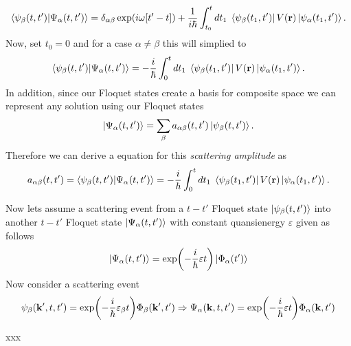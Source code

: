 \begin{equation} \label{4.15}
  \begin{aligned}
    \braket{\psi_{\beta}(t,t')}{\Psi_{\alpha}(t,t')} =
    \delta_{\alpha\beta}\exp(i\omega\qty[t'-t]) +
    \frac{1}{i\hbar}
    \int_{t_0}^t dt_1 \;
    \bra{\psi_{\beta}(t_1,t')}
    V(\mathbf{r}) \ket{\psi_{\alpha}(t_1,t')}.
  \end{aligned}
\end{equation}
Now, set $t_0 = 0$ and for a case $\alpha \neq \beta$ this will simplied to
\begin{equation} \label{4.16}
  \begin{aligned}
    \braket{\psi_{\beta}(t,t')}{\Psi_{\alpha}(t,t')} =
    -
    \frac{i}{\hbar}
    \int_{0}^t dt_1 \;
    \bra{\psi_{\beta}(t_1,t')}
    V(\mathbf{r}) \ket{\psi_{\alpha}(t_1,t')}.
  \end{aligned}
\end{equation}
In addition, since our Floquet states create a basis for composite space we can represent any solution using our Floquet states
\begin{equation} \label{4.17}
  \ket{\Psi_{\alpha}(t,t')} = \sum_{\beta} a_{\alpha\beta}(t,t')
  \ket{\psi_{\beta}(t,t')}.
\end{equation}
Therefore we can derive a equation for this \textit{scattering amplitude} as
\begin{equation} \label{4.18}
  a_{\alpha\beta}(t,t') =
  \braket{\psi_{\beta}(t,t')}{\Psi_{\alpha}(t,t')} =
  -
  \frac{i}{\hbar}
  \int_{0}^t dt_1 \;
  \bra{\psi_{\beta}(t_1,t')}
  V(\mathbf{r}) \ket{\psi_{\alpha}(t_1,t')}.
\end{equation}

\vspace{5mm}
\noindent
Now lets assume a scattering event from a $t-t'$ Floquet state $\ket{\psi_{\beta}(t,t')}$ into another $t-t'$ Floquet state $\ket{\Psi_{\alpha}(t,t')}$ with constant quansienergy $\varepsilon$ given as follows
\begin{equation} \label{4.19}
  \ket{\Psi_{\alpha}(t,t')} =
  \exp(-\frac{i}{\hbar}\varepsilon t)
  \ket{\Phi_{\alpha}(t')}
\end{equation}
Now consider a scattering event
\begin{equation} \label{4.20}
  \psi_{\beta}(\mathbf{k'},t,t') = \exp(-\frac{i}{\hbar}\varepsilon_{\beta} t)
  \Phi_{\beta}(\mathbf{k'},t')
  \Rightarrow
  \Psi_{\alpha}(\mathbf{k},t,t') = \exp(-\frac{i}{\hbar}\varepsilon t)
  \Phi_{\alpha}(\mathbf{k},t')
\end{equation}

























xxx
